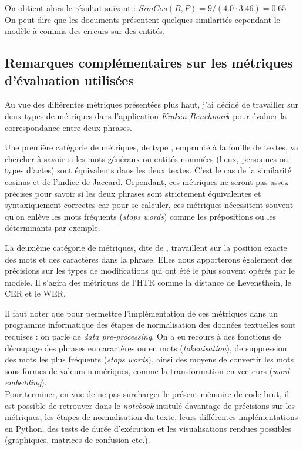 On obtient alors le résultat suivant : $SimCos(R,P) = 9 / (4.0 \cdot 3.46) = 0.65$ \\ On peut dire que les documents présentent quelques similarités cependant le modèle à commis des erreurs sur des entités.

\subsection{Remarques complémentaires sur les métriques d'évaluation utilisées}

Au vue des différentes métriques présentées plus haut, j'ai décidé de travailler sur deux types de métriques dans l'application \textit{Kraken-Benchmark} pour évaluer la correspondance entre deux phrases.

Une première catégorie de métriques, de type , emprunté à la fouille de textes, va chercher à savoir si les mots généraux ou entités nommées (lieux, personnes ou types d'actes) sont équivalents dans les deux textes. C'est le cas de la similarité cosinus et de l'indice de Jaccard. Cependant, ces métriques ne seront pas assez précises pour savoir si les deux phrases sont strictement équivalentes et syntaxiquement correctes car pour se calculer, ces métriques nécessitent souvent qu'on enlève les mots fréquents (\textit{stops words}) comme les prépositions ou les déterminants par exemple.

La deuxième catégorie de métriques, dite de , travaillent sur la position exacte des mots et des caractères dans la phrase. Elles nous apporterons également des précisions sur les types de modifications qui ont été le plus souvent opérés par le modèle. Il s'agira des métriques  de l'HTR comme la distance de Levensthein, le CER et le WER.

Il faut noter que pour permettre l'implémentation de ces métriques dans un programme informatique des étapes de normalisation des données textuelles sont requises : on parle de \textit{data pre-processing}. On a eu recours à des fonctions de découpage des phrases en caractères ou en mots (\textit{tokenisation}), de suppression des mots les plus fréquents (\textit{stops words}), ainsi des moyens de convertir les mots sous formes de valeurs numériques, comme la transformation en vecteurs (\textit{word embedding}).\\

Pour terminer, en vue de ne pas surcharger le présent mémoire de code brut, il est possible de retrouver dans le \textit{notebook} intitulé  davantage de précisions sur les métriques, les étapes de normalisation du texte, leurs différentes implémentations en Python, des tests de durée d'exécution et les visualisations rendues possibles (graphiques, matrices de confusion etc.).\\

